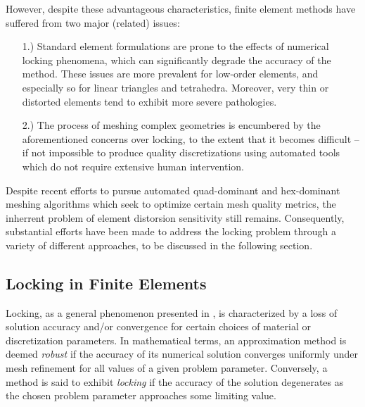 	However, despite these advantageous characteristics, finite element methods have suffered from two major (related) issues:
	\begin{itemize}
		\item[1.)] Standard element formulations are prone to the effects of numerical locking phenomena, which can significantly degrade the accuracy of the method. These issues are more prevalent for low-order elements, and especially so for linear triangles and tetrahedra. Moreover, very thin or distorted elements tend to exhibit more severe pathologies.
		\item[2.)] The process of meshing complex geometries is encumbered by the aforementioned concerns over locking, to the extent that it becomes difficult -- if not impossible to produce quality discretizations using automated tools which do not require extensive human intervention.
	\end{itemize}
	
	Despite recent efforts to pursue automated quad-dominant \cite{Remacle:12} and hex-dominant \cite{Xifeng:17} meshing algorithms which seek to optimize certain mesh quality metrics, the inherrent problem of element distorsion sensitivity still remains. Consequently, substantial efforts have been made to address the locking problem through a variety of different approaches, to be discussed in the following section.

	\subsection{Locking in Finite Elements}
	
		Locking, as a general phenomenon presented in \cite{Babuska&Suri:92:1}, is characterized by a loss of solution accuracy and/or convergence for certain choices of material or discretization parameters. In mathematical terms, an approximation method is deemed \textit{robust} if the accuracy of its numerical solution converges uniformly under mesh refinement for all values of a given problem parameter. Conversely, a method is said to exhibit \textit{locking} if the accuracy of the solution degenerates as the chosen problem parameter approaches some limiting value.
		
